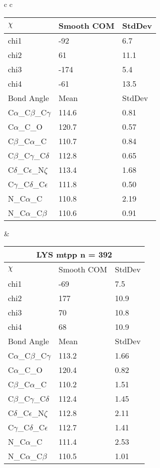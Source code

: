\begin{longtable}{ c c }
\begin{tabular}{ l l l }
  $\chi$       & Smooth COM & StdDev \\ \midrule
  chi1 & -92 & 6.7 \\ 
  chi2 & 61 & 11.1 \\ 
  chi3 & -174 & 5.4 \\ 
  chi4 & -61 & 13.5 \\ \midrule
  Bond Angle   & Mean     & StdDev \\ \midrule
  C$\alpha$\_C$\beta$\_C$\gamma$ & 114.6 & 0.81\\
  C$\alpha$\_C\_O & 120.7 & 0.57\\
  C$\beta$\_C$\alpha$\_C & 110.7 & 0.84\\
  C$\beta$\_C$\gamma$\_C$\delta$ & 112.8 & 0.65\\
  C$\delta$\_C$\epsilon$\_N$\zeta$ & 113.4 & 1.68\\
  C$\gamma$\_C$\delta$\_C$\epsilon$ & 111.8 & 0.50\\
  N\_C$\alpha$\_C & 110.8 & 2.19\\
  N\_C$\alpha$\_C$\beta$ & 110.6 & 0.91\\
  \bottomrule
  \end{tabular}
  &
  \begin{tabular}{ l l l }
  \toprule
  \multicolumn{3}{c}{LYS \textbf{mtpp} n = 392} \\ \toprule
  $\chi$       & Smooth COM & StdDev \\ \midrule
  chi1 & -69 & 7.5 \\ 
  chi2 & 177 & 10.9 \\ 
  chi3 & 70 & 10.8 \\ 
  chi4 & 68 & 10.9 \\ \midrule
  Bond Angle   & Mean     & StdDev \\ \midrule
  C$\alpha$\_C$\beta$\_C$\gamma$ & 113.2 & 1.66\\
  C$\alpha$\_C\_O & 120.4 & 0.82\\
  C$\beta$\_C$\alpha$\_C & 110.2 & 1.51\\
  C$\beta$\_C$\gamma$\_C$\delta$ & 112.4 & 1.45\\
  C$\delta$\_C$\epsilon$\_N$\zeta$ & 112.8 & 2.11\\
  C$\gamma$\_C$\delta$\_C$\epsilon$ & 112.7 & 1.41\\
  N\_C$\alpha$\_C & 111.4 & 2.53\\
  N\_C$\alpha$\_C$\beta$ & 110.5 & 1.01\\
  \bottomrule
  \end{tabular}
  \\

\end{longtable}
